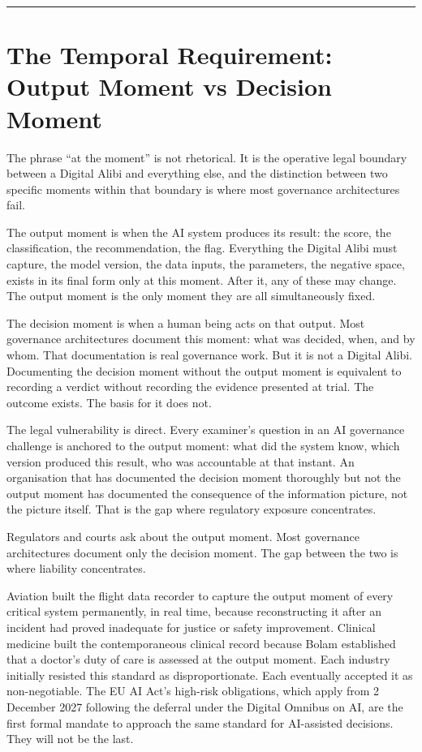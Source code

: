 \begin{center}\rule{0.5\linewidth}{0.5pt}\end{center}

\section{The Temporal Requirement: Output Moment vs Decision Moment}

The phrase ``at the moment'' is not rhetorical. It is the operative legal boundary between a Digital Alibi and everything else, and the distinction between two specific moments within that boundary is where most governance architectures fail.

The output moment is when the AI system produces its result: the score, the classification, the recommendation, the flag. Everything the Digital Alibi must capture, the model version, the data inputs, the parameters, the negative space, exists in its final form only at this moment. After it, any of these may change. The output moment is the only moment they are all simultaneously fixed.

The decision moment is when a human being acts on that output. Most governance architectures document this moment: what was decided, when, and by whom. That documentation is real governance work. But it is not a Digital Alibi. Documenting the decision moment without the output moment is equivalent to recording a verdict without recording the evidence presented at trial. The outcome exists. The basis for it does not.

The legal vulnerability is direct. Every examiner's question in an AI governance challenge is anchored to the output moment: what did the system know, which version produced this result, who was accountable at that instant. An organisation that has documented the decision moment thoroughly but not the output moment has documented the consequence of the information picture, not the picture itself. That is the gap where regulatory exposure concentrates.

Regulators and courts ask about the output moment. Most governance architectures document only the decision moment. The gap between the two is where liability concentrates.

Aviation built the flight data recorder to capture the output moment of every critical system permanently, in real time, because reconstructing it after an incident had proved inadequate for justice or safety improvement. Clinical medicine built the contemporaneous clinical record because Bolam established that a doctor's duty of care is assessed at the output moment. Each industry initially resisted this standard as disproportionate. Each eventually accepted it as non-negotiable. The EU AI Act's high-risk obligations, which apply from 2 December 2027 following the deferral under the Digital Omnibus on AI, are the first formal mandate to approach the same standard for AI-assisted decisions. They will not be the last.

